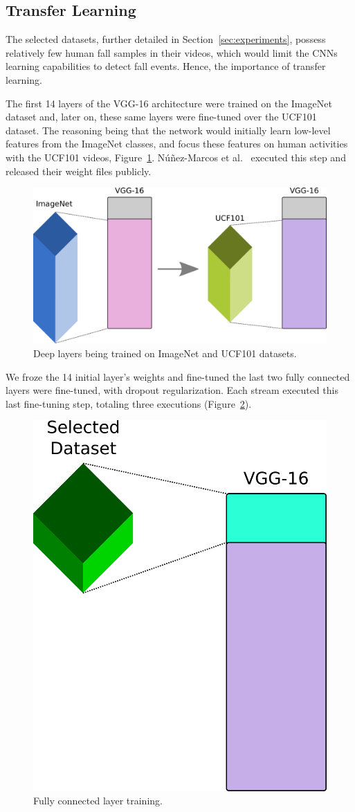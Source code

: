 \documentclass[conference]{IEEEtran}
\begin{document}
\subsection{Transfer Learning}

The selected datasets, further detailed in Section~\ref{sec:experiments}, possess relatively few human fall samples in their videos, which would limit the CNNs learning capabilities to detect fall events. Hence, the importance of transfer learning.

The first 14 layers of the VGG-16 architecture were trained on the ImageNet~\cite{imagenet_cvpr09} dataset and, later on, these same layers were fine-tuned over the UCF101~\cite{soomro2012ucf101} dataset. The reasoning being that the network would initially learn low-level features from the ImageNet classes, and focus these features on human activities with the UCF101 videos, Figure~\ref{fig:pre14}. N\'u\~nez-Marcos et al.~\cite{nunez2017vision} executed this step and released their weight files publicly.

\begin{figure}[!htb]
\centerline{\includegraphics[width=0.96\linewidth]{figures/pre14.png}}
\caption{Deep layers being trained on ImageNet and UCF101 datasets.}
\label{fig:pre14}
\end{figure}

We froze the 14 initial layer's weights and fine-tuned the last two fully connected layers were fine-tuned, with dropout regularization. Each stream executed this last fine-tuning step, totaling three executions (Figure~\ref{fig:pos14}).

\begin{figure}[!htb]
\centerline{\includegraphics[width=0.43\linewidth]{figures/pos14.png}}
\caption{Fully connected layer training.}
\label{fig:pos14}
\end{figure}
\end{document}
